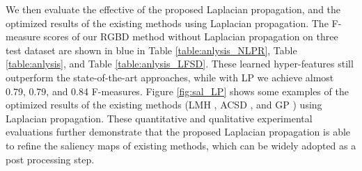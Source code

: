 \documentclass[journal]{IEEEtran}
\begin{document}
We then evaluate the effective of the proposed Laplacian propagation, and the optimized results of the existing methods using Laplacian propagation. The F-measure scores of our RGBD method without Laplacian propagation on three test dataset \cite{peng2014rgbd,ju2014depth,Li_2014_CVPR} are shown in blue in Table \ref{table:anlysis_NLPR}, Table \ref{table:anlysis}, and Table \ref{table:anlysis_LFSD}. These learned hyper-features still outperform the state-of-the-art approaches, while with LP we achieve almost 0.79, 0.79, and 0.84 F-measures. Figure \ref{fig:sal_LP} shows some examples of the optimized results of the existing methods (LMH \cite{peng2014rgbd}, ACSD \cite{ju2014depth}, and GP \cite{ren2015exploiting}) using Laplacian propagation.
These quantitative and qualitative experimental
evaluations further demonstrate that the proposed Laplacian propagation is able to refine the saliency maps of existing methods, which can be widely adopted as a post processing step.
\end{document}
